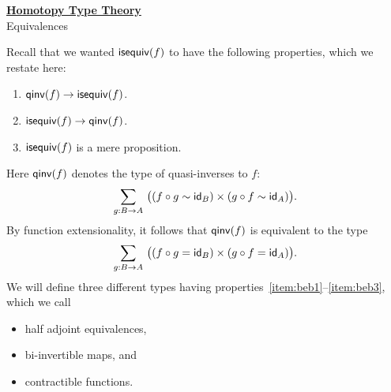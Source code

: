 \documentclass[hott-all.tex]{subfiles}
\begin{document}
\begin{center}
  {\Large{\underline{\textbf{Homotopy Type Theory}}}} \\[2mm]
  {\large Equivalences}
\end{center}
\setcounter{chapter}{4}


Recall that we wanted $\mathsf{isequiv}(f)$ to have the following properties, which we restate here:
\begin{enumerate}
\item $\mathsf{qinv}(f) \to \mathsf{isequiv} (f)$.\label{item:beb1}
\item $\mathsf{isequiv} (f) \to \mathsf{qinv}(f)$.\label{item:beb2}
\item $\mathsf{isequiv}(f)$ is a mere proposition.\label{item:beb3}
\end{enumerate}
Here $\mathsf{qinv}(f)$ denotes the type of quasi-inverses to $f$:
\begin{equation*}
  \sm{g:B\to A} \big((f \circ g \htpy \idfunc[B]) \times (g\circ f \htpy \idfunc[A])\big).
\end{equation*}
By function extensionality, it follows that $\mathsf{qinv}(f)$ is equivalent to the type
\begin{equation*}
  \sm{g:B\to A} \big((f \circ g = \idfunc[B]) \times (g\circ f = \idfunc[A])\big).
\end{equation*}
We will define three different types having properties~\ref{item:beb1}--\ref{item:beb3}, which we call
\begin{itemize}
\item half adjoint equivalences,
\item bi-invertible maps,
  and
\item contractible functions.
\end{itemize}
%
\end{document}
